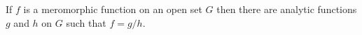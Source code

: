 If $f$ is a meromorphic function on an open set $G$ then there are analytic functions $g$ and $h$ on $G$ such that $f = g/h$.